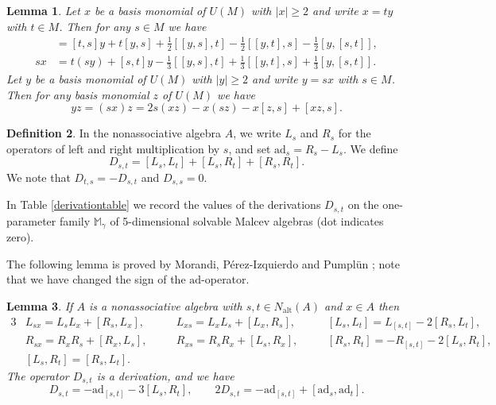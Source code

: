 \documentclass{amsart}
\theoremstyle{plain}
\newtheorem{lemma}{Lemma}[section]
\theoremstyle{definition}
\newtheorem{definition}[lemma]{Definition}
\begin{document}
\begin{lemma} \label{shestakovlemma}
Let $x$ be a basis monomial of $U(M)$ with $|x| \ge 2$ and write $x = ty$ with
$t \in M$.  Then for any $s \in M$ we have
  \allowdisplaybreaks
  \begin{align}
  [x,s]
  &=
  [t,s]y
  +
  t[y,s]
  +
  \tfrac12
  [[y,s],t]
  -
  \tfrac12
  [[y,t],s]
  -
  \tfrac12
  [y,[s,t]],
  \label{rightbracketformula}
  \\
  sx
  &=
  t(sy)
  +
  [s,t]y
  -
  \tfrac13
  [[y,s],t]
  +
  \tfrac13
  [[y,t],s]
  +
  \tfrac13
  [y,[s,t]].
  \label{leftproductformula}
  \end{align}
Let $y$ be a basis monomial of $U(M)$ with $|y| \ge 2$ and write $y = sx$ with
$s \in M$. Then for any basis monomial $z$ of $U(M)$ we have
  \begin{equation}
  yz = (sx)z = 2 s(xz) - x(sz) - x[z,s] + [xz,s].
  \end{equation}
\end{lemma}

\begin{definition}
In the nonassociative algebra $A$, we write $L_s$ and $R_s$ for the operators
of left and right multiplication by $s$, and set $\mathrm{ad}_s = R_s - L_s$.
We define
 \[
  D_{s,t} = [L_s, L_t] + [L_s, R_t] + [R_s, R_t].
 \]
We note that $D_{t,s} = - D_{s,t}$ and $D_{s,s} = 0$.
\end{definition}

In Table \ref{derivationtable} we record the values of the derivations
$D_{s,t}$ on the one-parameter family $\mathbb{M}_\gamma$ of 5-dimensional
solvable Malcev algebras (dot indicates zero).

The following lemma is proved by Morandi, P\'erez-Izquierdo and Pumpl\"un
\cite[Lemma 4.2]{Morandi}; note that we have changed the sign of the
$\mathrm{ad}$-operator.

\begin{lemma} \label{morandilemma}
If $A$ is a nonassociative algebra with $s, t \in N_{\mathrm{alt}}(A)$ and $x
\in A$ then
  \allowdisplaybreaks
  \begin{alignat*}{3}
  &
  L_{sx} = L_s L_x + [R_s, L_x],
  &\quad
  &
  L_{xs} = L_x L_s + [L_x, R_s],
  &\quad
  &
  [L_s, L_t] = L_{[s,t]} - 2 [R_s, L_t],
  \\
  &
  R_{sx} = R_x R_s + [R_x, L_s],
  &\quad
  &
  R_{xs} = R_s R_x + [ L_s, R_x],
  &\quad
  &
  [R_s, R_t] = - R_{[s,t]} - 2 [L_s, R_t],
  \\
  &
  [L_s, R_t] = [R_s, L_t].
  \end{alignat*}
The operator $D_{s,t}$ is a derivation, and we have
  \[
  D_{s,t} = -\mathrm{ad}_{[s,t]} - 3 [L_s, R_t],
  \qquad
  2 D_{s,t} = - \mathrm{ad}_{[s,t]} + [\mathrm{ad}_s, \mathrm{ad}_t].
  \]
\end{lemma}
\end{document}
